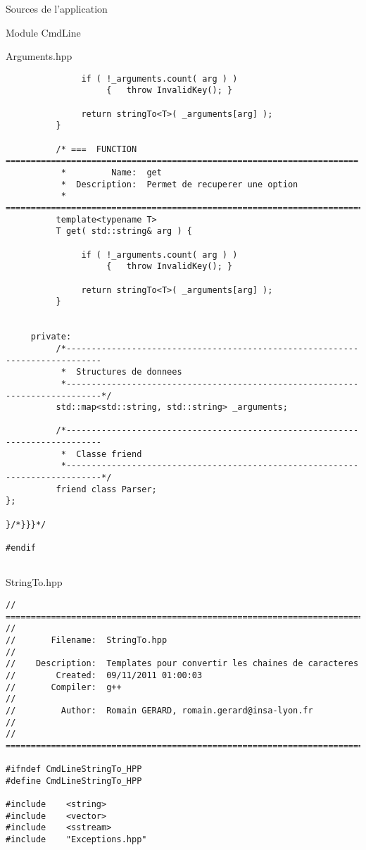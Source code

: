 \documentclass{article}
\begin{document}
\begin{section}{Sources de l'application}
\begin{subsection}{Module CmdLine}
\begin{paragraph}{Arguments.hpp}
\begin{verbatim}
               if ( !_arguments.count( arg ) )
                    {   throw InvalidKey(); }

               return stringTo<T>( _arguments[arg] );
          }

          /* ===  FUNCTION  ======================================================================
           *         Name:  get
           *  Description:  Permet de recuperer une option 
           * =====================================================================================*/
          template<typename T>
          T get( std::string& arg ) {

               if ( !_arguments.count( arg ) )
                    {   throw InvalidKey(); }

               return stringTo<T>( _arguments[arg] );
          }


     private:
          /*-----------------------------------------------------------------------------
           *  Structures de donnees
           *-----------------------------------------------------------------------------*/
          std::map<std::string, std::string> _arguments;

          /*-----------------------------------------------------------------------------
           *  Classe friend
           *-----------------------------------------------------------------------------*/
          friend class Parser;
};

}/*}}}*/

#endif


  \end{verbatim}
  \end{paragraph}




\newpage
  \begin{paragraph}{StringTo.hpp}
   \begin{verbatim}
// =====================================================================================
// 
//       Filename:  StringTo.hpp
// 
//    Description:  Templates pour convertir les chaines de caracteres
//        Created:  09/11/2011 01:00:03
//       Compiler:  g++
// 
//         Author:  Romain GERARD, romain.gerard@insa-lyon.fr
// 
// =====================================================================================

#ifndef CmdLineStringTo_HPP
#define CmdLineStringTo_HPP

#include	<string>
#include	<vector>
#include	<sstream>
#include	"Exceptions.hpp"



\end{verbatim}
\end{paragraph}
\end{subsection}
\end{section}
\end{document}
